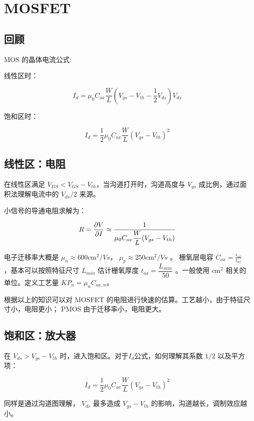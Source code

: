 \documentclass[cn,11pt,chinese,black,simple]{../elegantbook}
\begin{document}
\fi 
\def\chapname{01mosfet}

\chapter{MOSFET}

\section*{回顾}

MOS 的晶体电流公式:

线性区时： 

\[
I_d = \mu_0 C_{ox} \frac{W}{L} (V_{gs} - V_{th} - \frac{1}{2} V_{ds}) V_{ds} 
\]

饱和区时：

\[
I_d = \frac{1}{2} \mu_0 C_{ox} \frac{W}{L} (V_{gs} - V_{th})^2
\]

\section{线性区：电阻}

在线性区满足 \(V_{DS} < V_{GS} - V_{th}\)，当沟道打开时，沟道高度与 \(V_{gs}\) 成比例，通过面积法理解电流中的 \(V_{ds}/2 \) 来源。

小信号的导通电阻求解为：

\[
R = \frac{\partial{}V}{\partial{}I} \approx \frac{1}{\mu_0 C_{ox} \dfrac{W}{L} (V_{gs} - V_{th}) }  
\]


电子迁移率大概是 \(\mu_n \approx 600 \text{cm}^2/Vs\)， \(\mu_p \approx 250 \text{cm}^2/Vs\) 。 栅氧层电容 \(C_{ox} = \frac{\epsilon_{ox}}{t_{ox}}\) ，基本可以按照特征尺寸 \(L_{min}\) 估计栅氧厚度 \(t_{ox} = \dfrac{L_{min}}{50}\) 。一般使用 \(\text{cm}^2\) 相关的单位。定义工艺量 \(KP_{n} = \mu_n C_{ox,n}\)。

根据以上的知识可以对 MOSFET 的电阻进行快速的估算。工艺越小，由于特征尺寸小，电阻更小； PMOS 由于迁移率小，电阻更大。

\section{饱和区：放大器}

在 \(V_{ds} > V_{gs} - V_{th}\) 时，进入饱和区。对于\(I_d\)公式，如何理解其系数 \(1/2\) 以及平方项：


\[
I_d = \frac{1}{2} \mu_0 C_{ox} \frac{W}{L} (V_{gs} - V_{th})^2
\]

同样是通过沟道图理解， \(V_{ds}\) 最多造成 \(V_{gs} - V_{th}\) 的影响，沟道越长，调制效应越小。
\end{document}

